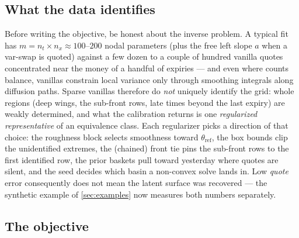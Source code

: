 \documentclass[11pt]{article}
\begin{document}
\subsection{What the data identifies}
\label{sec:identify}

Before writing the objective, be honest about the inverse problem. A typical
fit has $m=n_t\times n_x\approx100$--$200$ nodal parameters (plus the free
left slope $a$ when a var-swap is quoted) against a few dozen to a couple of
hundred vanilla quotes concentrated near the money of a handful of expiries
--- and even where counts balance, vanillas constrain local variance only
through smoothing integrals along diffusion paths. Sparse vanillas therefore
do \emph{not} uniquely identify the grid: whole regions (deep wings, the
sub-front rows, late times beyond the last expiry) are weakly determined,
and what the calibration returns is one \emph{regularized representative} of
an equivalence class. Each regularizer picks a direction of that choice: the
roughness block selects smoothness toward $\theta_{\text{ref}}$, the box
bounds clip the unidentified extremes, the (chained) front tie pins the
sub-front rows to the first identified row, the prior baskets pull toward
yesterday where quotes are silent, and the seed decides which basin a
non-convex solve lands in. Low \emph{quote} error consequently does not mean
the latent surface was recovered --- the synthetic example of
\cref{sec:examples} now measures both numbers separately.

\subsection{The objective}
\end{document}
